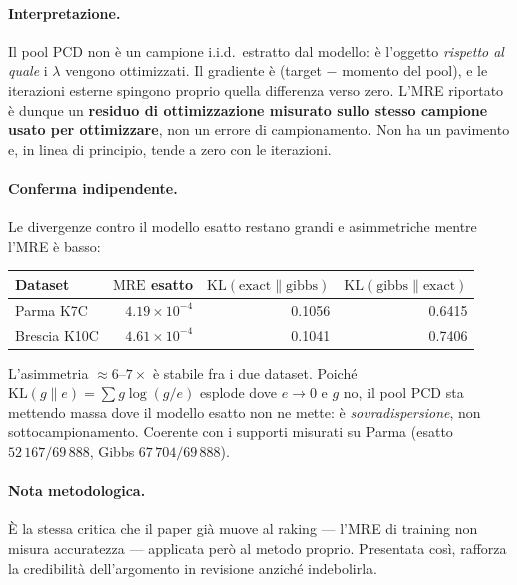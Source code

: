 \documentclass[11pt,a4paper]{article}
\newcommand{\MRE}{\mathrm{MRE}}
\begin{document}
\paragraph{Interpretazione.} Il pool PCD non è un campione i.i.d.\
estratto dal modello: è l'oggetto \emph{rispetto al quale} i $\lambda$
vengono ottimizzati. Il gradiente è (target $-$ momento del pool), e le
iterazioni esterne spingono proprio quella differenza verso zero. L'MRE
riportato è dunque un \textbf{residuo di ottimizzazione misurato sullo
stesso campione usato per ottimizzare}, non un errore di
campionamento. Non ha un pavimento e, in linea di principio, tende a
zero con le iterazioni.

\paragraph{Conferma indipendente.} Le divergenze contro il modello
esatto restano grandi e asimmetriche mentre l'MRE è basso:

\begin{center}
\begin{tabular}{lrrr}
\toprule
Dataset & $\MRE$ esatto & $\mathrm{KL}(\text{exact}\|\text{gibbs})$
        & $\mathrm{KL}(\text{gibbs}\|\text{exact})$ \\
\midrule
Parma K7C    & $4.19\times10^{-4}$ & 0.1056 & 0.6415 \\
Brescia K10C & $4.61\times10^{-4}$ & 0.1041 & 0.7406 \\
\bottomrule
\end{tabular}
\end{center}

L'asimmetria $\approx6$--$7\times$ è stabile fra i due dataset. Poiché
$\mathrm{KL}(g\|e)=\sum g\log(g/e)$ esplode dove $e\to0$ e $g$ no, il
pool PCD sta mettendo massa dove il modello esatto non ne mette: è
\emph{sovradispersione}, non sottocampionamento. Coerente con i
supporti misurati su Parma (esatto $52\,167/69\,888$, Gibbs
$67\,704/69\,888$).

\paragraph{Nota metodologica.} È la stessa critica che il paper già
muove al raking --- l'MRE di training non misura accuratezza ---
applicata però al metodo proprio. Presentata così, rafforza la
credibilità dell'argomento in revisione anziché indebolirla.

\end{document}
